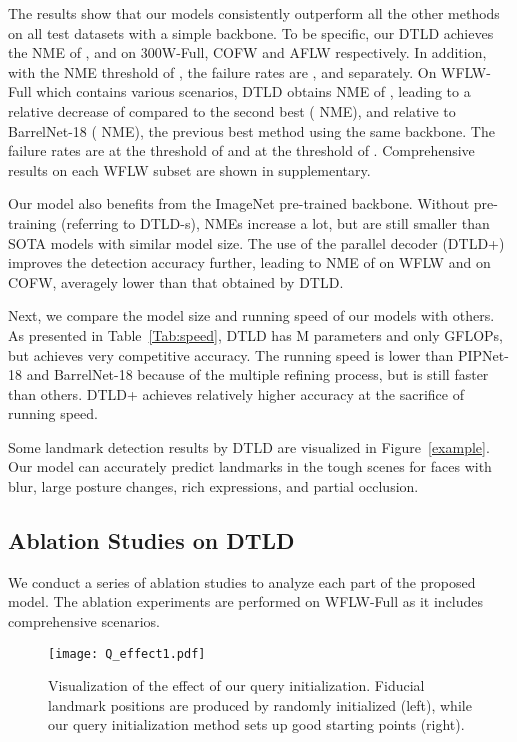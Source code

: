 The results show that our models consistently outperform all the other methods on all test datasets with a simple backbone. To be specific, our DTLD achieves the NME of ,  and  on 300W-Full, COFW and AFLW respectively. In addition, with the NME threshold of , the failure rates are ,  and  separately.
On WFLW-Full which contains various scenarios, DTLD obtains NME of , leading to a relative decrease of  compared to the second best ( NME), and  relative to BarrelNet-18 ( NME), the previous best method using the same backbone. The failure rates are  at the threshold of  and  at the threshold of . Comprehensive results on each WFLW subset are shown in supplementary.

Our model also benefits from the ImageNet pre-trained backbone. Without pre-training (referring to DTLD-s), NMEs increase a lot, but are still smaller than SOTA models with similar model size.
The use of the parallel decoder (DTLD+) improves the detection accuracy further, leading to NME of  on WFLW and  on COFW, averagely  lower than that obtained by DTLD.


Next, we compare the model size and running speed of our models with others. As presented in Table~\ref{Tab:speed}, DTLD has M parameters and only  GFLOPs, but achieves very competitive accuracy. The running speed is lower than PIPNet-18 and BarrelNet-18 because of the multiple refining process, but is still faster than others. DTLD+ achieves relatively higher accuracy at the sacrifice of running speed.



Some landmark detection results by DTLD are visualized in Figure~\ref{example}. Our model can accurately predict landmarks in the tough scenes for faces with blur, large posture changes, rich expressions, and partial occlusion.

\subsection{Ablation Studies on DTLD}
\label{utld_ex}

We conduct a series of ablation studies to analyze each part of the proposed model. The ablation experiments are performed on WFLW-Full as it includes comprehensive scenarios.

\begin{figure}[t]
    \centering
        \texttt{[image: Q\_effect1.pdf]}
    \caption{Visualization of the effect of our query initialization. Fiducial landmark positions are produced by randomly initialized  (left), while our query initialization method sets up good starting points (right).}
    \vspace{-5mm}
\label{Qeffect}
\end{figure}



